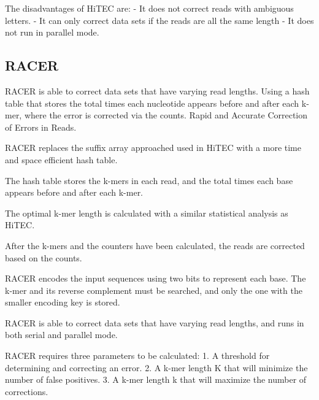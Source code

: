 \documentclass{llncs}
\begin{document}
The disadvantages of HiTEC are:
- It does not correct reads with ambiguous letters.
- It can only correct data sets if the reads are all the same length
- It does not run in parallel mode.

\subsection{RACER}
RACER \cite{Racer} is able to correct data sets that have varying read lengths. Using a hash table that stores the total times each nucleotide appears before and after each k-mer, where the error is corrected via the counts.
Rapid and Accurate Correction of Errors in Reads.

RACER replaces the suffix array approached used in HiTEC with a more time and space efficient hash table. 

The hash table stores the k-mers in each read, and the total times each base appears before and after each k-mer.

The optimal k-mer length is calculated with a similar statistical analysis as HiTEC.

After the k-mers and the counters have been calculated, the reads are corrected
based on the counts.

RACER encodes the input sequences using two bits to represent each base.
The k-mer and its reverse complement must be searched, and only the one with the smaller encoding key is stored. 


RACER is able to correct data sets that have varying read lengths, and runs in both serial and parallel mode.


RACER requires three parameters to be calculated:
1. A threshold for determining and correcting an error.
2. A k-mer length K that will minimize the number of false positives.
3. A k-mer length k that will maximize the number of corrections. 
\end{document}
